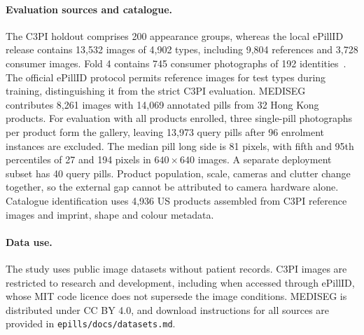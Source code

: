 \paragraph{Evaluation sources and catalogue.}
The C3PI holdout comprises 200 appearance groups, whereas the local ePillID release contains 13,532 images of 4,902 types, including 9,804 references and 3,728 consumer images. Fold 4 contains 745 consumer photographs of 192 identities~\citep{usuyama2020epillid}. The official ePillID protocol permits reference images for test types during training, distinguishing it from the strict C3PI evaluation. MEDISEG~\citep{mediseg2026} contributes 8,261 images with 14,069 annotated pills from 32 Hong Kong products. For evaluation with all products enrolled, three single-pill photographs per product form the gallery, leaving 13,973 query pills after 96 enrolment instances are excluded. The median pill long side is 81 pixels, with fifth and 95th percentiles of 27 and 194 pixels in $640\times640$ images. A separate deployment subset has 40 query pills. Product population, scale, cameras and clutter change together, so the external gap cannot be attributed to camera hardware alone. Catalogue identification uses 4,936 US products assembled from C3PI reference images and imprint, shape and colour metadata.

\paragraph{Data use.}
The study uses public image datasets without patient records. C3PI images are restricted to research and development, including when accessed through ePillID, whose MIT code licence does not supersede the image conditions. MEDISEG is distributed under CC BY 4.0, and download instructions for all sources are provided in \texttt{epills/docs/datasets.md}.
